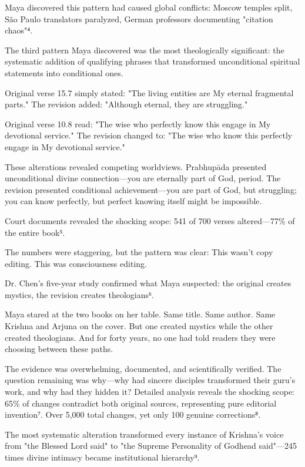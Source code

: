 \documentclass[11pt,twoside]{book}
\begin{document}
Maya discovered this pattern had caused global conflicts: Moscow temples split, São Paulo translators paralyzed, German professors documenting "citation chaos"⁴.

The third pattern Maya discovered was the most theologically significant: the systematic addition of qualifying phrases that transformed unconditional spiritual statements into conditional ones.

Original verse 15.7 simply stated: "The living entities are My eternal fragmental parts."
The revision added: "Although eternal, they are struggling."

Original verse 10.8 read: "The wise who perfectly know this engage in My devotional service."
The revision changed to: "The wise who know this perfectly engage in My devotional service."

These alterations revealed competing worldviews. Prabhupāda presented unconditional divine connection—you are eternally part of God, period. The revision presented conditional achievement—you are part of God, but struggling; you can know perfectly, but perfect knowing itself might be impossible.

Court documents revealed the shocking scope: 541 of 700 verses altered—77\% of the entire book⁵.

The numbers were staggering, but the pattern was clear: This wasn't copy editing. This was consciousness editing.

Dr. Chen's five-year study confirmed what Maya suspected: the original creates mystics, the revision creates theologians⁶.

Maya stared at the two books on her table. Same title. Same author. Same Krishna and Arjuna on the cover. But one created mystics while the other created theologians. And for forty years, no one had told readers they were choosing between these paths.

The evidence was overwhelming, documented, and scientifically verified. The question remaining was why—why had sincere disciples transformed their guru's work, and why had they hidden it?
Detailed analysis reveals the shocking scope: 65\% of changes contradict both original sources, representing pure editorial invention⁷. Over 5,000 total changes, yet only 100 genuine corrections⁸.

The most systematic alteration transformed every instance of Krishna's voice from "the Blessed Lord said" to "the Supreme Personality of Godhead said"—245 times divine intimacy became institutional hierarchy⁹.
\end{document}
